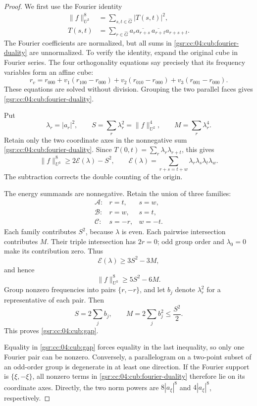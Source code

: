 \documentclass[11pt,letterpaper]{article}
\numberwithin{equation}{section}
\theoremstyle{definition}
\theoremstyle{remark}
\newcommand{\1}{\mathbf 1}
\begin{document}
\begin{proof}
We first use the Fourier identity
\begin{align}
 \|f\|_{U^3}^{8}&=\sum_{s,t\in\widehat G}|T(s,t)|^2,
 \label{gsr:cc:04:cub:fourier-duality}\\
 T(s,t)&=\sum_{r\in\widehat G}
       a_r\overline{a_{r+s}}\,\overline{a_{r+t}}a_{r+s+t}.
 \nonumber
\end{align}
The Fourier coefficients are normalized, but all sums in
\eqref{gsr:cc:04:cub:fourier-duality} are unnormalized. To verify the identity, expand
the original cube in Fourier series. The four orthogonality equations say
precisely that its frequency variables form an affine cube:
\[
 r_v=r_{000}+v_1(r_{100}-r_{000})
             +v_2(r_{010}-r_{000})+v_3(r_{001}-r_{000}).
\]
These equations are solved without division. Grouping the two parallel
faces gives \eqref{gsr:cc:04:cub:fourier-duality}.

Put
\[
 \lambda_r=|a_r|^2,\qquad S=\sum_r\lambda_r^2=\|f\|_{U^2}^4,
 \qquad M=\sum_r\lambda_r^4.
\]
Retain only the two coordinate axes in the nonnegative sum
\eqref{gsr:cc:04:cub:fourier-duality}. Since
$T(0,t)=\sum_r\lambda_r\lambda_{r+t}$, this gives
\begin{equation}
 \|f\|_{U^3}^8\geq2\mathcal E(\lambda)-S^2,
 \qquad
 \mathcal E(\lambda)=\sum_{r+s=t+w}\lambda_r\lambda_s\lambda_t\lambda_w.
 \label{gsr:cc:04:cub:axes-energy}
\end{equation}
The subtraction corrects the double counting of the origin.

The energy summands are nonnegative. Retain the union of three families:
\[
 \begin{array}{lll}
 \mathcal A:&r=t,&s=w,\\
 \mathcal B:&r=w,&s=t,\\
 \mathcal C:&s=-r,&w=-t.
 \end{array}
\]
Each family contributes $S^2$, because $\lambda$ is even. Each pairwise
intersection contributes $M$. Their triple intersection has $2r=0$;
odd group order and $\lambda_0=0$ make its contribution zero. Thus
\[
          \mathcal E(\lambda)\geq3S^2-3M,
\]
and hence
\begin{equation}
                 \|f\|_{U^3}^8\geq5S^2-6M.
 \label{gsr:cc:04:cub:strong-gap-intermediate}
\end{equation}
Group nonzero frequencies into pairs $\{r,-r\}$, and let $b_j$ denote
$\lambda_r^2$ for a representative of each pair. Then
\[
 S=2\sum_jb_j,\qquad M=2\sum_jb_j^2\leq\frac{S^2}{2}.
\]
This proves \eqref{gsr:cc:04:cub:gap}.

Equality in \eqref{gsr:cc:04:cub:gap} forces equality in the last inequality, so
only one Fourier pair can be nonzero. Conversely, a parallelogram on a
two-point subset of an odd-order group is degenerate in at least one
direction. If the Fourier support is $\{\xi,-\xi\}$, all nonzero terms in
\eqref{gsr:cc:04:cub:fourier-duality} therefore lie on its coordinate axes. Directly,
the two norm powers are $8|a_\xi|^8$ and $4|a_\xi|^8$, respectively.
\end{proof}
\end{document}
